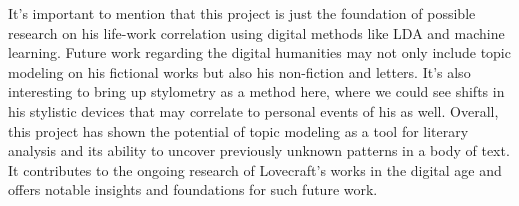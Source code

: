 It’s important to mention that this project is just the foundation of possible research on his 
life-work correlation using digital methods like LDA and machine learning. Future work regarding 
the digital humanities may not only include topic modeling on his fictional works but also his 
non-fiction and letters. It’s also interesting to bring up stylometry as a method here, where 
we could see shifts in his stylistic devices that may correlate to personal events of his as 
well. Overall, this project has shown the potential of topic modeling as a tool for literary 
analysis and its ability to uncover previously unknown patterns in a body of text. It contributes 
to the ongoing research of Lovecraft’s works in the digital age and offers notable insights and 
foundations for such future work.
